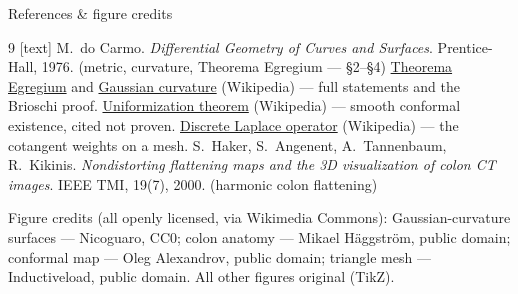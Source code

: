 \documentclass[aspectratio=169,10pt]{beamer}
\begin{document}
\begin{frame}{References \& figure credits}
  \footnotesize
  \begin{thebibliography}{9}
    [text]
     M.~do Carmo. \emph{Differential Geometry of Curves and Surfaces}. Prentice-Hall, 1976. (metric, curvature, Theorema Egregium --- \S2--\S4)
     \href{https://en.wikipedia.org/wiki/Theorema_Egregium}{Theorema Egregium} and \href{https://en.wikipedia.org/wiki/Gaussian_curvature}{Gaussian curvature} (Wikipedia) --- full statements and the Brioschi proof.
     \href{https://en.wikipedia.org/wiki/Uniformization_theorem}{Uniformization theorem} (Wikipedia) --- smooth conformal existence, cited not proven.
     \href{https://en.wikipedia.org/wiki/Discrete_Laplace_operator}{Discrete Laplace operator} (Wikipedia) --- the cotangent weights on a mesh.
     S.~Haker, S.~Angenent, A.~Tannenbaum, R.~Kikinis. \emph{Nondistorting flattening maps and the 3D visualization of colon CT images}. IEEE TMI, 19(7), 2000. (harmonic colon flattening)
  \end{thebibliography}
  \smallskip
  {\scriptsize Figure credits (all openly licensed, via Wikimedia Commons): Gaussian-curvature surfaces --- Nicoguaro, CC0; colon anatomy --- Mikael Häggström, public domain; conformal map --- Oleg Alexandrov, public domain; triangle mesh --- Inductiveload, public domain. All other figures original (TikZ).}
\end{frame}
\end{document}
